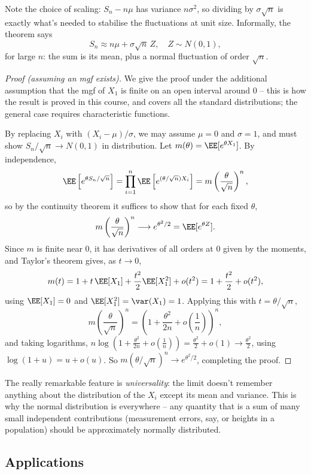 Note the choice of scaling: $S_n - n\mu$ has variance $n\sigma^2$, so dividing by $\sigma\sqrt{n}$ is exactly what's needed to stabilise the fluctuations at unit size. Informally, the theorem says
$$
S_n \approx n\mu + \sigma\sqrt{n}\, Z, \quad Z \sim N(0, 1),
$$
for large $n$: the sum is its mean, plus a normal fluctuation of order $\sqrt{n}$.

\begin{proof}[Proof (assuming an mgf exists)]
	We give the proof under the additional assumption that the mgf of $X_1$ is finite on an open interval around $0$ -- this is how the result is proved in this course, and covers all the standard distributions; the general case requires characteristic functions.

	By replacing $X_i$ with $(X_i - \mu)/\sigma$, we may assume $\mu = 0$ and $\sigma = 1$, and must show $S_n/\sqrt{n} \rightarrow N(0, 1)$ in distribution. Let $m(\theta) = \EE[e^{\theta X_1}]$. By independence,
	$$
	\EE\left[e^{\theta S_n / \sqrt{n}}\right] = \prod_{i = 1}^{n}\EE\left[e^{(\theta/\sqrt{n})X_i}\right] = m\left(\frac{\theta}{\sqrt{n}}\right)^{n},
	$$
	so by the continuity theorem it suffices to show that for each fixed $\theta$,
	$$
	m\left(\frac{\theta}{\sqrt{n}}\right)^{n} \longrightarrow e^{\theta^2/2} = \EE[e^{\theta Z}].
	$$
	Since $m$ is finite near $0$, it has derivatives of all orders at $0$ given by the moments, and Taylor's theorem gives, as $t \rightarrow 0$,
	$$
	m(t) = 1 + t\,\EE[X_1] + \frac{t^2}{2}\EE[X_1^2] + o(t^2) = 1 + \frac{t^2}{2} + o(t^2),
	$$
	using $\EE[X_1] = 0$ and $\EE[X_1^2] = \var(X_1) = 1$. Applying this with $t = \theta/\sqrt{n}$,
	$$
	m\left(\frac{\theta}{\sqrt{n}}\right)^n = \left(1 + \frac{\theta^2}{2n} + o\left(\frac1n\right)\right)^{n},
	$$
	and taking logarithms, $n \log\left(1 + \frac{\theta^2}{2n} + o(\frac1n)\right) = \frac{\theta^2}{2} + o(1) \rightarrow \frac{\theta^2}{2}$, using $\log(1 + u) = u + o(u)$. So $m(\theta/\sqrt{n})^n \rightarrow e^{\theta^2/2}$, completing the proof.
\end{proof}

The really remarkable feature is \emph{universality}: the limit doesn't remember anything about the distribution of the $X_i$ except its mean and variance. This is why the normal distribution is everywhere -- any quantity that is a sum of many small independent contributions (measurement errors, say, or heights in a population) should be approximately normally distributed.

\subsection{Applications}

